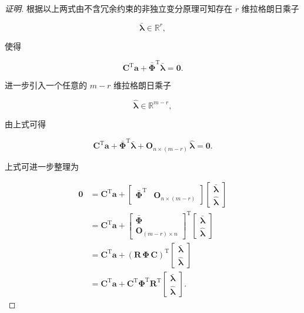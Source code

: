 \begin{proof}[证明]
根据以上两式由不含冗余约束的非独立变分原理可知存在 $r$ 维拉格朗日乘子

\[
\bar{\boldsymbol{\lambda}}\in\mathbb{R}^r,
\]

使得

\[
\boldsymbol{C}^{\mathrm{T}}\boldsymbol{a}+\bar{\boldsymbol{\Phi}}^{\mathrm{T}}\bar{\boldsymbol{\lambda}}=\boldsymbol{0}.
\]

进一步引入一个任意的 $m-r$ 维拉格朗日乘子

\[
\hat{\boldsymbol{\lambda}}\in\mathbb{R}^{m-r},
\]

由上式可得

\[
\boldsymbol{C}^{\mathrm{T}}\boldsymbol{a}+\bar{\boldsymbol{\Phi}}^{\mathrm{T}}\bar{\boldsymbol{\lambda}}+\boldsymbol{O}_{n\times(m-r)}\,\hat{\boldsymbol{\lambda}}=\boldsymbol{0}.
\]

上式可进一步整理为

\[
\begin{aligned}
\boldsymbol{0}&=\boldsymbol{C}^{\mathrm{T}}\boldsymbol{a}+\begin{bmatrix}\bar{\boldsymbol{\Phi}}^{\mathrm{T}}&\boldsymbol{O}_{n\times(m-r)}\end{bmatrix}\begin{bmatrix}\bar{\boldsymbol{\lambda}}\\\hat{\boldsymbol{\lambda}}\end{bmatrix}\\
&=\boldsymbol{C}^{\mathrm{T}}\boldsymbol{a}+\begin{bmatrix}\bar{\boldsymbol{\Phi}}\\\boldsymbol{O}_{(m-r)\times n}\end{bmatrix}^{\mathrm{T}}\begin{bmatrix}\bar{\boldsymbol{\lambda}}\\\hat{\boldsymbol{\lambda}}\end{bmatrix}\\
&=\boldsymbol{C}^{\mathrm{T}}\boldsymbol{a}+(\boldsymbol{R}\,\boldsymbol{\Phi}\,\boldsymbol{C})^{\mathrm{T}}\begin{bmatrix}\bar{\boldsymbol{\lambda}}\\\hat{\boldsymbol{\lambda}}\end{bmatrix}\\
&=\boldsymbol{C}^{\mathrm{T}}\boldsymbol{a}+\boldsymbol{C}^{\mathrm{T}}\boldsymbol{\Phi}^{\mathrm{T}}\boldsymbol{R}^{\mathrm{T}}\begin{bmatrix}\bar{\boldsymbol{\lambda}}\\\hat{\boldsymbol{\lambda}}\end{bmatrix}.
\end{aligned}
\]


\end{proof}
